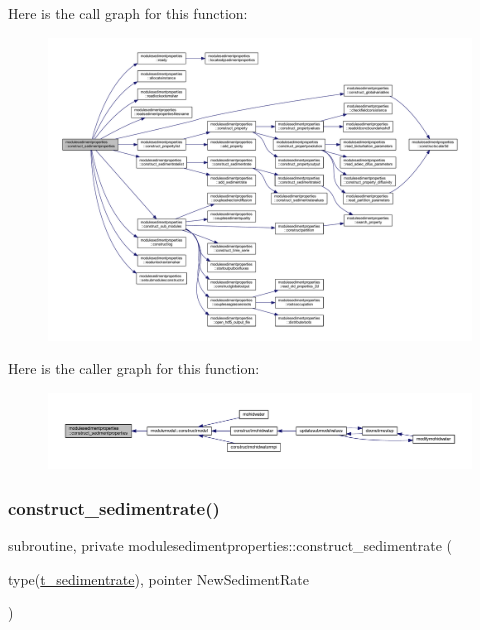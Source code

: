 Here is the call graph for this function\+:\nopagebreak
\begin{figure}[H]
\begin{center}
\leavevmode
\includegraphics[width=350pt]{namespacemodulesedimentproperties_a73be9d7faf93dc6b2994d535213bbd58_cgraph}
\end{center}
\end{figure}
Here is the caller graph for this function\+:\nopagebreak
\begin{figure}[H]
\begin{center}
\leavevmode
\includegraphics[width=350pt]{namespacemodulesedimentproperties_a73be9d7faf93dc6b2994d535213bbd58_icgraph}
\end{center}
\end{figure}
\mbox{\label{namespacemodulesedimentproperties_a945018b7c1fcfbb5687c6021d5636530}} 
\subsubsection{\texorpdfstring{construct\+\_\+sedimentrate()}{construct\_sedimentrate()}}
{\footnotesize\ttfamily subroutine, private modulesedimentproperties\+::construct\+\_\+sedimentrate (\begin{DoxyParamCaption}\item[{type(\mbox{\hyperlink{structmodulesedimentproperties_1_1t__sedimentrate}{t\+\_\+sedimentrate}}), pointer}]{New\+Sediment\+Rate }\end{DoxyParamCaption})\hspace{0.3cm}{\ttfamily [private]}}

